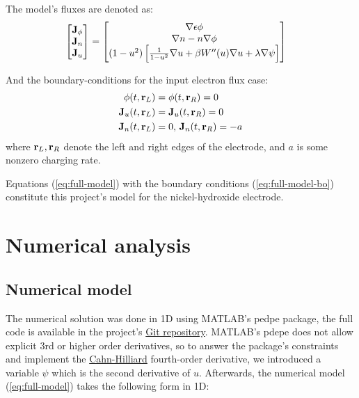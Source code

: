 \documentclass[12pt]{article}
\begin{document}
The model's fluxes are denoted as:  
\begin{align} \label{eq:full-model-vector-notation}
    \begin{bmatrix}
        {\bf J}_{\phi} \\
        {\bf J}_n \\
        {\bf J}_u 
    \end{bmatrix}
    &= \begin{bmatrix}
        \nabla \epsilon \phi \\
        \nabla n - n \nabla \phi \\
        (1-u^2) \left[ \frac{1}{1-u^2} \nabla u + \beta W''(u) \nabla u + \lambda \nabla \psi \right] 
   \end{bmatrix}
\end{align}

And the boundary-conditions for the input electron flux case:
\begin{equation}\label{eq:full-model-bo}
    \begin{aligned}
        \phi(t, {\bf r}_L) &= \phi(t, {\bf r}_R) = 0 \\
        {\bf J}_u(t, {\bf r}_L) &= {\bf J}_u(t, {\bf r}_R) = 0 \\
        {\bf J}_n(t, {\bf r}_L) &= 0, \,  {\bf J}_n(t, {\bf r}_R) = -a
    \end{aligned}
\end{equation}
where ${\bf r}_L, {\bf r}_R$ denote the left and right edges of the electrode, and $a$ is some nonzero charging rate.

Equations (\ref{eq:full-model}) with the boundary conditions (\ref{eq:full-model-bo}) constitute this project's model for the nickel-hydroxide electrode.

\pagebreak
\section{Numerical analysis} \label{seq3}
\subsection{Numerical model} \label{sec:numerical-model}
The numerical solution was done in 1D using MATLAB's pedpe package, the full code is available in the project's \href{https://github.com/nadav7679/phase_field_Ni_batteries/tree/main/matlab/nickel}{Git repository}. MATLAB's pdepe does not allow  explicit 3rd or higher order derivatives, so to answer the package's constraints and implement the \hyperref[sec:Cahn-Hilliard] {Cahn-Hilliard} fourth-order derivative, we introduced a variable $\psi$ which is the second derivative of $u$. Afterwards, the numerical model (\ref{eq:full-model}) takes the following form in 1D:   
\end{document}
